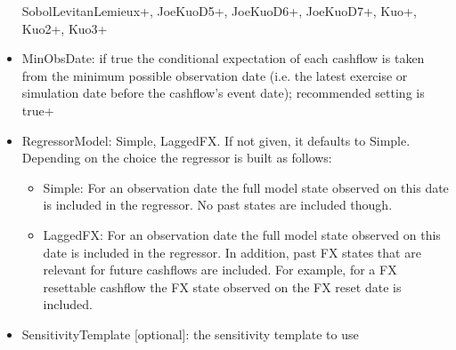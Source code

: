 \begin{itemize}
  SobolLevitanLemieux+, JoeKuoD5+, JoeKuoD6+, JoeKuoD7+, Kuo+, Kuo2+, Kuo3+
\item MinObsDate: if true the conditional expectation of each cashflow is taken from the minimum possible observation
  date (i.e. the latest exercise or simulation date before the cashflow's event date); recommended setting is true+
\item RegressorModel: Simple, LaggedFX. If not given, it defaults to Simple. Depending on the choice the regressor is
  built as follows:
  \begin{itemize}
    \item Simple: For an observation date the full model state observed on this date is included in the regressor. No
      past states are included though.
    \item LaggedFX: For an observation date the full model state observed on this date is included in the regressor. In
      addition, past FX states that are relevant for future cashflows are included. For example, for a FX resettable
      cashflow the FX state observed on the FX reset date is included.
  \end{itemize}
\item SensitivityTemplate [optional]: the sensitivity template to use
\end{itemize}

